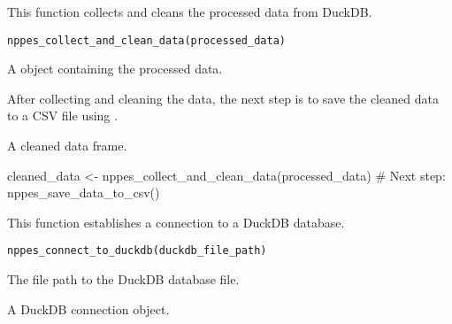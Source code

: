 \documentclass[a4paper]{book}
\begin{document}
%
\begin{Description}
This function collects and cleans the processed data from DuckDB.
\end{Description}
%
\begin{Usage}
\begin{verbatim}
nppes_collect_and_clean_data(processed_data)
\end{verbatim}
\end{Usage}
%
\begin{Arguments}
\begin{ldescription}
\item[\code{processed\_data}] A  object containing the processed data.
\end{ldescription}
\end{Arguments}
%
\begin{Details}
After collecting and cleaning the data, the next step is to save the cleaned data to a CSV file using .
\end{Details}
%
\begin{Value}
A cleaned data frame.
\end{Value}
%
\begin{Examples}
\begin{ExampleCode}
cleaned_data <- nppes_collect_and_clean_data(processed_data)
# Next step: nppes_save_data_to_csv()
\end{ExampleCode}
\end{Examples}
%
\begin{Description}
This function establishes a connection to a DuckDB database.
\end{Description}
%
\begin{Usage}
\begin{verbatim}
nppes_connect_to_duckdb(duckdb_file_path)
\end{verbatim}
\end{Usage}
%
\begin{Arguments}
\begin{ldescription}
\item[\code{duckdb\_file\_path}] The file path to the DuckDB database file.
\end{ldescription}
\end{Arguments}
%
\begin{Value}
A DuckDB connection object.
\end{Value}
\end{document}
